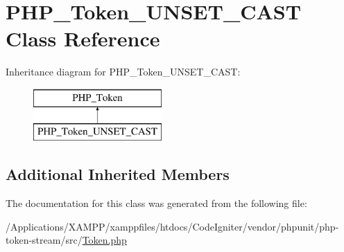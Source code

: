 \hypertarget{class_p_h_p___token___u_n_s_e_t___c_a_s_t}{}\section{P\+H\+P\+\_\+\+Token\+\_\+\+U\+N\+S\+E\+T\+\_\+\+C\+A\+ST Class Reference}
\label{class_p_h_p___token___u_n_s_e_t___c_a_s_t}
Inheritance diagram for P\+H\+P\+\_\+\+Token\+\_\+\+U\+N\+S\+E\+T\+\_\+\+C\+A\+ST\+:\begin{figure}[H]
\begin{center}
\leavevmode
\includegraphics[height=2.000000cm]{class_p_h_p___token___u_n_s_e_t___c_a_s_t}
\end{center}
\end{figure}
\subsection*{Additional Inherited Members}


The documentation for this class was generated from the following file\+:\begin{DoxyCompactItemize}
\item 
/\+Applications/\+X\+A\+M\+P\+P/xamppfiles/htdocs/\+Code\+Igniter/vendor/phpunit/php-\/token-\/stream/src/\mbox{\hyperlink{_token_8php}{Token.\+php}}\end{DoxyCompactItemize}

